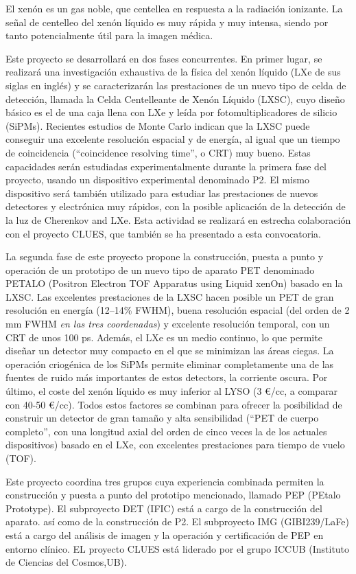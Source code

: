El xenón es un gas noble, que centellea en respuesta a la radiación ionizante. La señal de centelleo del xenón líquido es muy rápida y muy intensa, siendo por tanto potencialmente útil para la imagen médica.

Este proyecto se desarrollará en dos fases concurrentes. En primer lugar, se realizará una investigación 
exhaustiva de la física del xenón líquido (LXe de sus siglas en inglés) y se caracterizarán las prestaciones de un nuevo tipo de celda de detección, llamada la Celda Centelleante de Xenón Líquido (LXSC), cuyo diseño básico es el de una caja llena con LXe y leída por fotomultiplicadores de silicio (SiPMs). Recientes estudios de
Monte Carlo indican que la LXSC puede conseguir una excelente resolución espacial y de energía, al igual que un tiempo de coincidencia (``coincidence resolving time'', o CRT) muy bueno. Estas capacidades serán estudiadas
experimentalmente durante la primera fase del proyecto, usando un dispositivo experimental denominado P2. El mismo dispositivo será también utilizado para estudiar las prestaciones de nuevos detectores y electrónica muy rápidos, con la posible aplicación de la detección de la luz de Cherenkov and LXe. Esta actividad se realizará en estrecha colaboración con el proyecto CLUES, que también se ha presentado a esta convocatoria. 

La segunda fase de este proyecto propone la construcción, puesta a punto y operación de un prototipo de un nuevo tipo de aparato PET denominado PETALO (Positron Electron TOF Apparatus using Liquid xenOn) basado en la LXSC. Las excelentes prestaciones de la LXSC hacen posible un PET de gran resolución en energía (12--14\% FWHM), buena resolución espacial (del orden de 2 mm FWHM {\em en las tres coordenadas}) y excelente resolución temporal, con un CRT de unos 100 ps. Además, el LXe es un medio continuo, lo que permite diseñar un detector muy compacto en el que se minimizan las áreas ciegas. La operación criogénica de los SiPMs permite eliminar completamente una de las fuentes de ruido más importantes de estos detectors, la corriente oscura. Por último, el coste del xenón líquido es muy inferior al LYSO (3 \euro/cc, a comparar con 40-50 \euro/cc). Todos estos factores se combinan para ofrecer la posibilidad de construir un detector de gran tamaño y alta sensibilidad (``PET de cuerpo completo'', con una longitud axial del orden de cinco veces la de los actuales dispositivos) basado en el LXe, con excelentes prestaciones para tiempo de vuelo (TOF).  

Este proyecto coordina tres grupos cuya experiencia combinada permiten la construcción y puesta a punto del prototipo mencionado,  llamado PEP (PEtalo Prototype). El subproyecto DET (IFIC) está a cargo de la construcción del aparato. así como de la construcción de P2.  El subproyecto IMG (GIBI239/LaFe) está a cargo del análisis de imagen y la operación y certificación de PEP en entorno clínico. EL proyecto CLUES está liderado por el grupo ICCUB (Instituto de Ciencias del Cosmos,UB).



